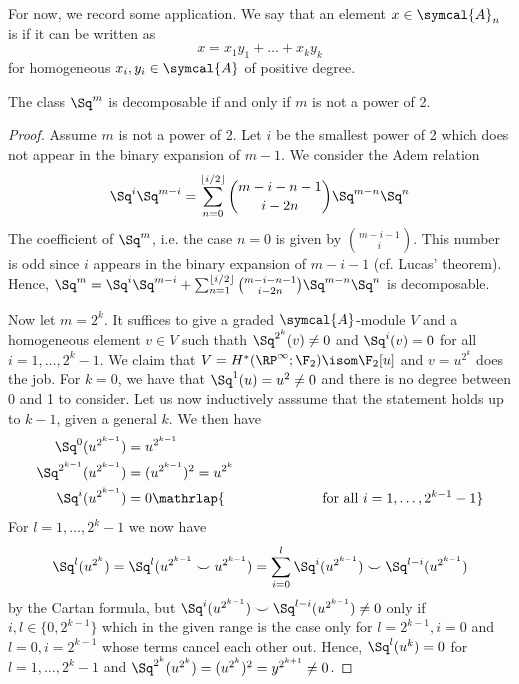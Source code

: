 For now, we record some application.
We say that an element $x \in \symcal{A}_n$ is  if it can be written as
\begin{equation*}
	x = x_1 y_1 + \ldots + x_k y_k
\end{equation*}
for homogeneous $x_i, y_i \in \symcal{A}$ of positive degree.
\begin{lemma}
	The class $\Sq^m$ is decomposable if and only if $m$ is not a power of 2.
\end{lemma}
\begin{proof}
	Assume $m$ is not a power of 2.
	Let $i$ be the smallest power of 2 which does not appear in the binary expansion of $m - 1$.
	We consider the Adem relation
	\begin{equation*}
		\Sq^i \Sq^{m - i} = \sum_{n = 0}^{\lfloor i / 2\rfloor} \binom{m - i - n - 1}{i - 2n} \Sq^{m - n} \Sq^n
	\end{equation*}
	The coefficient of $\Sq^m$, i.e. the case $n = 0$ is given by $\binom{m - i -1}{i}$.
	This number is odd since $i$ appears in the binary expansion of $m - i - 1$ (cf. Lucas' theorem). %
	Hence, $\Sq^m = \Sq^i \Sq^{m - i} + \sum_{n = 1}^{\lfloor i / 2\rfloor} \binom{m - i - n - 1}{i - 2n} \Sq^{m - n} \Sq^n$ is decomposable.

	Now let $m = 2^k$.
	It suffices to give a graded $\symcal{A}$-module $V$ and a homogeneous element $v \in V$ such thath $\Sq^{2^k}(v) \neq 0$ and $\Sq^i(v) = 0$ for all $i = 1, \ldots, 2^k - 1$.
	We claim that $V = H^*(\RP^\infty; \F_2) \isom \F_2[u]$ and $v = u^{2^k}$ does the job.
	For $k = 0$, we have that $\Sq^1(u) = u^2 \neq 0$ and there is no degree between 0 and 1 to consider.
	Let us now inductively asssume that the statement holds up to $k - 1$, given a general $k$.
	We then have
	\begin{align*}
		\Sq^0(u^{2^{k - 1}}) &= u^{2^{k - 1}} \\
		\Sq^{2^{k - 1}}(u^{2^{k - 1}}) &= (u^{2^{k - 1}})^2 = u^{2^k} \qquad\qquad\\
		\Sq^i(u^{2^{k - 1}}) &= 0 \mathrlap{\qquad\qquad\qquad\quad\text{for all } i = 1, \ldots, 2^{k - 1} - 1}
	\end{align*}
	For $l = 1, \ldots, 2^k - 1$ we now have
	\begin{equation*}
		\Sq^l(u^{2^k}) = \Sq^l(u^{2^{k - 1}} \smile u^{2^{k - 1}}) = \sum_{i = 0}^l \Sq^i(u^{2^{k - 1}}) \smile \Sq^{l - i}(u^{2^{k - 1}})
	\end{equation*}
	by the Cartan formula, but $\Sq^i(u^{2^{k - 1}}) \smile \Sq^{l - i}(u^{2^{k - 1}}) \neq 0$ only if $i, l \in \{0, 2^{k - 1}\}$ which in the given range is the case only for $l = 2^{k - 1}, i = 0$ and $l = 0, i = 2^{k - 1}$ whose terms cancel each other out.
	Hence, $\Sq^l(u^k) = 0$ for $l = 1, \ldots, 2^k - 1$ and $\Sq^{2^k}(u^{2^k}) = (u^{2^k})^2 = y^{2^{k + 1}} \neq 0$.
\end{proof}

